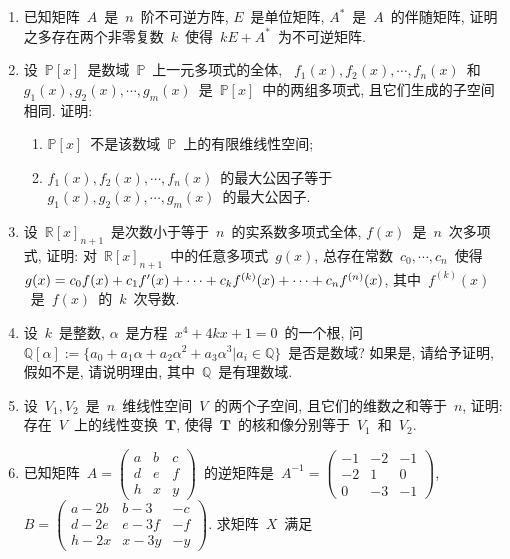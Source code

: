 \documentclass[UTF8,a4paper,11pt]{article}
\begin{document}
\begin{enumerate}
	\item 已知矩阵~$A$~是~$n$~阶不可逆方阵, $E$~是单位矩阵, $A^{*}$~是~$A$~的伴随矩阵, 证明之多存在两个非零复数~$k$~使得~$kE+A^{*}$~为不可逆矩阵.
	      \vspace{2em}
	\item 设~$\mathbb{P}[x]$~是数域~$\mathbb{P}$~上一元多项式的全体, ~$f_1(x), f_2(x),\cdots, f_n(x)$~和~$g_1(x), g_2(x),\cdots,g_m(x)$~是~$\mathbb{P}[x]$~中的两组多项式, 且它们生成的子空间相同. 证明:
	      \begin{enumerate}
		      \item $\mathbb{P}[x]$~不是该数域~$\mathbb{P}$~上的有限维线性空间;
		      \item $f_1(x), f_2(x),\cdots, f_n(x)$~的最大公因子等于~$g_1(x), g_2(x),\cdots,g_m(x)$~的最大公因子.
	      \end{enumerate}
	      \vspace{2em}
	\item 设~$\mathbb{R}[x]_{n+1}$~是次数小于等于~$n$~的实系数多项式全体, $f(x)$~是~$n$~次多项式, 证明: 对~$\mathbb{R}[x]_{n+1}$~中的任意多项式~$g(x)$, 总存在常数~$c_0, \cdots, c_n$~使得~$g(x)=c_0f(x)+c_1f\rq{}(x)+\cdots+c_kf^{(k)}(x)+\cdots+c_nf^{(n)}(x)$, 其中~$f^{(k)}(x)$~是~$f(x)$~的~$k$~次导数.
	      \vspace{2em}
	\item 设~$k$~是整数, $\alpha$~是方程~$x^4+4kx+1=0$~的一个根, 问~$\mathbb{Q}[\alpha]:=\{a_0+a_1\alpha+a_2\alpha^2+a_3\alpha^3|a_i\in\mathbb{Q}\}$~是否是数域? 如果是, 请给予证明, 假如不是, 请说明理由, 其中~$\mathbb{Q}$~是有理数域.
	      \vspace{2em}
	\item 设~$V_1,V_2$~是~$n$~维线性空间~$V$~的两个子空间, 且它们的维数之和等于~$n$, 证明: 存在~$V$~上的线性变换~$\mathbf{T}$, 使得~$\mathbf{T}$~的核和像分别等于~$V_1$~和~$V_2$.
	      \vspace{2em}
	\item 已知矩阵~$A=\begin{pmatrix} a & b & c\\ d & e & f\\ h & x & y\end{pmatrix}$~的逆矩阵是~$A^{-1}=\begin{pmatrix} -1 & -2 & -1\\ -2 & 1 & 0\\ 0 & -3 & -1\end{pmatrix}$, $B=\begin{pmatrix}a-2b & b-3 & -c\\ d-2e & e-3f & -f\\ h-2x & x-3y & -y\end{pmatrix}$. 求矩阵~$X$~满足

\end{enumerate}
\end{document}
